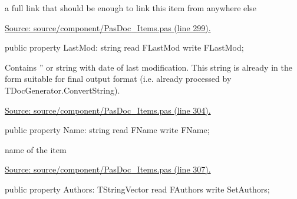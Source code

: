 \documentclass{report}
\newif\ifpdf
\begin{document}
\begin{list}{}
\begin{flushleft}
\ifpdf
\end{flushleft}
\fi


\par a full link that should be enough to link this item from anywhere else\par
\href{https://github.com/pasdoc/pasdoc/blob/master/source/component/PasDoc_Items.pas#L299}{Source: source/component/PasDoc{\_}Items.pas (line 299).}\label{PasDoc_Items.TBaseItem-LastMod}
\item[\textbf{LastMod}\hfill]
\ifpdf
\begin{flushleft}
\fi
\begin{ttfamily}
public property LastMod: string read FLastMod write FLastMod;\end{ttfamily}

\ifpdf
\end{flushleft}
\fi


\par Contains '' or string with date of last modification. This string is already in the form suitable for final output format (i.e. already processed by TDocGenerator.ConvertString).\par
\href{https://github.com/pasdoc/pasdoc/blob/master/source/component/PasDoc_Items.pas#L304}{Source: source/component/PasDoc{\_}Items.pas (line 304).}\label{PasDoc_Items.TBaseItem-Name}
\item[\textbf{Name}\hfill]
\ifpdf
\begin{flushleft}
\fi
\begin{ttfamily}
public property Name: string read FName write FName;\end{ttfamily}

\ifpdf
\end{flushleft}
\fi


\par name of the item\par
\href{https://github.com/pasdoc/pasdoc/blob/master/source/component/PasDoc_Items.pas#L307}{Source: source/component/PasDoc{\_}Items.pas (line 307).}\label{PasDoc_Items.TBaseItem-Authors}
\item[\textbf{Authors}\hfill]
\ifpdf
\begin{flushleft}
\fi
\begin{ttfamily}
public property Authors: TStringVector read FAuthors write SetAuthors;\end{ttfamily}

\ifpdf
\end{flushleft}
\fi



\end{list}
\end{document}
